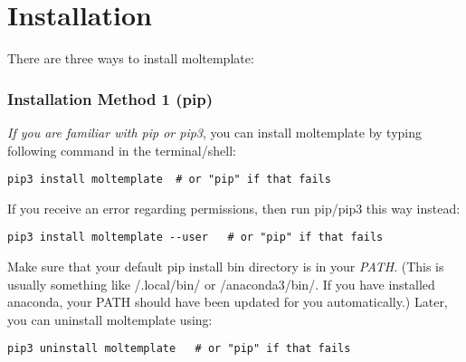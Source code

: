 \documentclass[11pt]{article}
\begin{document}




\section{Installation}
\label{sec:installation}

There are three ways to install moltemplate:

\subsubsection*{Installation Method 1 (pip)}
\label{sec:install_pip}
\textit{If you are familiar with pip or pip3}, you can install
moltemplate by typing following command in the terminal/shell:
\begin{verbatim}
pip3 install moltemplate  # or "pip" if that fails
\end{verbatim}
If you receive an error regarding permissions,
then run pip/pip3 this way instead:
\begin{verbatim}
pip3 install moltemplate --user   # or "pip" if that fails
\end{verbatim}
Make sure that your default pip install bin directory is in your \textit{PATH}.
(This is usually something like \texttildelow/.local/bin/ or
\texttildelow/anaconda3/bin/.  If you have installed anaconda, your PATH
should have been updated for you automatically.)
Later, you can uninstall moltemplate using:
\begin{verbatim}
pip3 uninstall moltemplate   # or "pip" if that fails
\end{verbatim}
\end{document}
